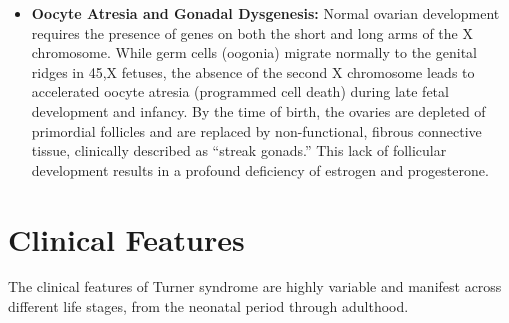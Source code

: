 \begin{itemize}
    \item \textbf{Oocyte Atresia and Gonadal Dysgenesis:} Normal ovarian development requires the presence of genes on both the short and long arms of the X chromosome. While germ cells (oogonia) migrate normally to the genital ridges in 45,X fetuses, the absence of the second X chromosome leads to accelerated oocyte atresia (programmed cell death) during late fetal development and infancy. By the time of birth, the ovaries are depleted of primordial follicles and are replaced by non-functional, fibrous connective tissue, clinically described as ``streak gonads.'' This lack of follicular development results in a profound deficiency of estrogen and progesterone.
\end{itemize}

\section*{Clinical Features}
The clinical features of Turner syndrome are highly variable and manifest across different life stages, from the neonatal period through adulthood.
